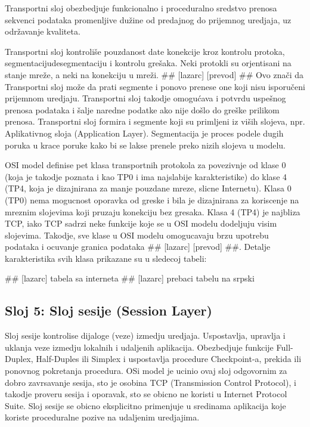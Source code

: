 \documentclass[a4paper,12pt, master]{etf}
\begin{document}
	Transportni sloj obezbedjuje funkcionalno i proceduralno sredstvo prenosa sekvenci podataka
	promenljive du\v{z}ine od predajnog do prijemnog uredjaja, uz odr\v{z}avanje kvaliteta.

	Transportni sloj kontroli\v{s}e pouzdanost date konekcije kroz kontrolu protoka,
	segmentaciju\/desegmentaciju i kontrolu gre\v{s}aka. Neki protokli su orjentisani na stanje 
	mre\v{z}e, a neki na konekciju u mre\v{z}i. \#\# [lazarc] [prevod] \#\# Ovo zna\v{c}i da Transportni 
	sloj mo\v{z}e da prati segmente i ponovo prenese one koji nisu isporu\v{c}eni prijemnom uredjaju. 
	Transportni sloj takodje omogu\'{c}ava i potvrdu uspe\v{s}nog prenosa podataka i \v{s}alje naredne 
	podatke ako nije do\v{s}lo do gre\v{s}ke prilikom prenosa. Transportni sloj formira i segmente 
	koji su primljeni iz vi\v{s}ih slojeva, npr. Aplikativnog sloja (Application Layer). 
	Segmentacija je proces podele dugih poruka u krace poruke kako bi se lakse prenele preko 
	nizih slojeva u modelu.

	OSI model definise pet klasa transportnih protokola za povezivnje od klase 0 (koja je 
	takodje poznata i kao TP0 i ima najslabije karakteristike) do klase 4 (TP4, koja je 
	dizajnirana za manje pouzdane mreze, slicne Internetu). Klasa 0 (TP0) nema mogucnost 
	oporavka od greske i bila je dizajnirana za koriscenje na mreznim slojevima koji pruzaju 
	konekciju bez gresaka. Klasa 4 (TP4) je najbliza TCP, iako TCP sadrzi neke funkcije koje 
	se u OSI modelu dodeljuju visim slojevima. Takodje, sve klase u OSI modelu omogucavaju 
	brzu upotrebu podataka i ocuvanje granica podataka \#\# [lazarc] [prevod] \#\#. Detalje 
	karakteristika svih klasa prikazane su u sledecoj tabeli:

	\#\# [lazarc] tabela sa interneta
	\#\# [lazarc] prebaci tabelu na srpski

	\subsection{Sloj 5: Sloj sesije (Session Layer)}

	Sloj sesije kontrolise dijaloge (veze) izmedju uredjaja. Uspostavlja, upravlja i uklanja 
	veze izmedju lokalnih i udaljenih aplikacija. Obezbedjuje funkcije Full-Duplex, 
	Half-Duples ili	Simplex i uspostavlja procedure Checkpoint-a, prekida ili ponovnog 
	pokretanja procedura. OSi model je ucinio ovaj sloj odgovornim za dobro zavrsavanje sesija,
	sto je osobina TCP (Transmission Control Protocol), i takodje proveru sesija i oporavak, 
	sto se obicno ne koristi u Internet Protocol Suite. Sloj sesije se obicno eksplicitno 
	primenjuje u sredinama aplikacija koje koriste proceduralne pozive na udaljenim uredjajima.
\end{document}
